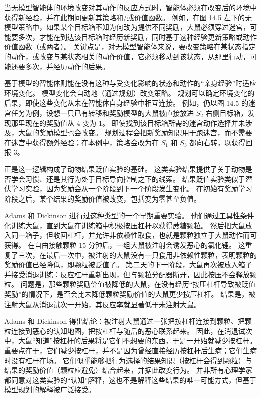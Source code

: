 \documentclass[UTF8, 12pt, fontset=fandol, oneside]{ctexart}
\begin{document}
当无模型智能体的环境改变对其动作的反应方式时，智能体必须在改变后的环境中获得新经验，并在此期间更新其策略和/或价值函数。
例如，在图 14.5 左下的无模型策略中，如果某个目标箱不知为何改为提供不同奖励，大鼠必须穿过迷宫，可能要多次，才能在到达该目标箱时经历新奖励，同时基于这种经验更新策略或动作价值函数（或两者）。
关键点是，对无模型智能体来说，要改变策略在某状态指定的动作，或改变与某状态相关的动作价值，它必须移动到该状态，从那里行动，可能还要多次，并经历动作的后果。

基于模型的智能体则能在没有这种与受变化影响的状态和动作的“亲身经验”时适应环境变化。
模型变化会自动地（通过规划）改变策略。
规划可以确定环境变化的后果，即使这些变化从未在智能体自身经验中相互连接。
例如，仍以图 14.5 的迷宫任务为例，设想一只已有转移和奖励模型的大鼠被直接放进 $S_2$ 右侧目标箱，发现那里现在的奖励值从 4 变为 1。
即使找到该目标箱所需的迷宫动作选择并未涉及，大鼠的奖励模型也会改变。
规划过程会把新奖励知识用于跑迷宫，而不需要在迷宫中获得额外经验；在本例中，策略会改为在 $S_1$ 和 $S_3$ 都向右转，以获得回报 3。

正是这一逻辑构成了动物结果贬值实验的基础。
这类实验结果提供了关于动物是否学会习惯、还是其行为处于目标导向控制之下的线索。
结果贬值实验类似于潜伏学习实验，因为奖励会从一个阶段到下一个阶段发生变化。
在初始有奖励学习阶段之后，某个结果的奖励价值被改变，包括变为零甚至负值。

Adams 和 Dickinson 进行过这种类型的一个早期重要实验。
他们通过工具性条件化训练大鼠，直到大鼠在训练箱中积极按压杠杆以获得蔗糖颗粒。
然后把大鼠放入同一箱子，但收回杠杆，并允许非依赖性取食，也就是颗粒独立于大鼠动作而可获得。
在自由接触颗粒 15 分钟后，一组大鼠被注射会诱发恶心的氯化锂。
这重复了三次，在最后一次中，被注射的大鼠没有一只食用非依赖性颗粒，表明颗粒的奖励价值已经降低，即颗粒被贬值了。
第二天的下一阶段，大鼠再次被放入箱子并接受消退训练：反应杠杆重新出现，但与颗粒分配器断开，因此按压不会释放颗粒。
问题是，那些颗粒奖励价值被降低的大鼠，在没有经历“按压杠杆导致被贬值奖励”的情况下，是否会比未降低颗粒奖励价值的大鼠更少按压杠杆。
结果是，被注射大鼠从消退试次一开始，其反应率就显著低于未注射大鼠。

Adams 和 Dickinson 得出结论：被注射大鼠通过一张把按杠杆连接到颗粒、把颗粒连接到恶心的认知地图，把按杠杆与随后的恶心联系起来。
因此，在消退试次中，大鼠“知道”按杠杆的后果将是它们不想要的东西，于是一开始就减少按杠杆。
重要点在于，它们减少按杠杆，并不是因为曾经直接经历按杠杆后生病；它们生病时没有杠杆在场。
它们似乎能够把行为选择的结果知识（按杠杆会得到颗粒）与结果的奖励价值（颗粒应避免）结合起来，并据此改变行为。
并非所有心理学家都同意对这类实验的“认知”解释，这也不是解释这些结果的唯一可能方式，但基于模型规划的解释被广泛接受。
\end{document}

